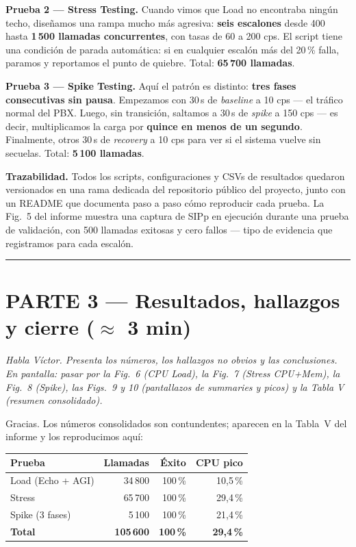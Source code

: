\documentclass[11pt]{article}
\newcommand{\cue}[1]{%
  \begin{tcolorbox}[colback=blockbg,colframe=blockbg,boxrule=0pt,arc=2pt,left=8pt,right=8pt,top=4pt,bottom=4pt]
    \footnotesize\itshape\color{muted}#1
  \end{tcolorbox}%
}
\begin{document}
\medskip
\textbf{Prueba 2 --- Stress Testing.} Cuando vimos que Load no encontraba ning\'un techo, dise\~namos una rampa mucho m\'as agresiva: \textbf{seis escalones} desde 400 hasta \textbf{1\,500 llamadas concurrentes}, con tasas de 60 a 200 cps. El script tiene una condici\'on de parada autom\'atica: si en cualquier escal\'on m\'as del 20\,\% falla, paramos y reportamos el punto de quiebre. Total: \textbf{65\,700 llamadas}.

\medskip
\textbf{Prueba 3 --- Spike Testing.} Aqu\'i el patr\'on es distinto: \textbf{tres fases consecutivas sin pausa}. Empezamos con 30\,s de \textit{baseline} a 10 cps --- el tr\'afico normal del PBX. Luego, sin transici\'on, saltamos a 30\,s de \textit{spike} a 150 cps --- es decir, multiplicamos la carga por \textbf{quince en menos de un segundo}. Finalmente, otros 30\,s de \textit{recovery} a 10 cps para ver si el sistema vuelve sin secuelas. Total: \textbf{5\,100 llamadas}.

\medskip
\textbf{Trazabilidad.} Todos los scripts, configuraciones y CSVs de resultados quedaron versionados en una rama dedicada del repositorio p\'ublico del proyecto, junto con un README que documenta paso a paso c\'omo reproducir cada prueba. La Fig.~5 del informe muestra una captura de SIPp en ejecuci\'on durante una prueba de validaci\'on, con 500 llamadas exitosas y cero fallos --- tipo de evidencia que registramos para cada escal\'on.

\vspace{6pt}\hrule\vspace{10pt}

\section*{PARTE 3 --- Resultados, hallazgos y cierre ($\approx$ 3 min)}

\cue{Habla V\'ictor. Presenta los n\'umeros, los hallazgos no obvios y las conclusiones. En pantalla: pasar por la Fig.~6 (CPU Load), la Fig.~7 (Stress CPU+Mem), la Fig.~8 (Spike), las Figs.~9 y 10 (pantallazos de summaries y picos) y la Tabla V (resumen consolidado).}

\noindent Gracias. Los n\'umeros consolidados son contundentes; aparecen en la Tabla~V del informe y los reproducimos aqu\'i:

\medskip
\begin{center}
\begin{tabular}{lrrr}
\hline
\textbf{Prueba} & \textbf{Llamadas} & \textbf{\'Exito} & \textbf{CPU pico} \\
\hline
Load (Echo + AGI)   & 34\,800   & 100\,\% & 10,5\,\% \\
Stress              & 65\,700   & 100\,\% & 29,4\,\% \\
Spike (3 fases)     &  5\,100   & 100\,\% & 21,4\,\% \\
\hline
\textbf{Total}      & \textbf{105\,600} & \textbf{100\,\%} & \textbf{29,4\,\%} \\
\hline
\end{tabular}
\end{center}
\end{document}
